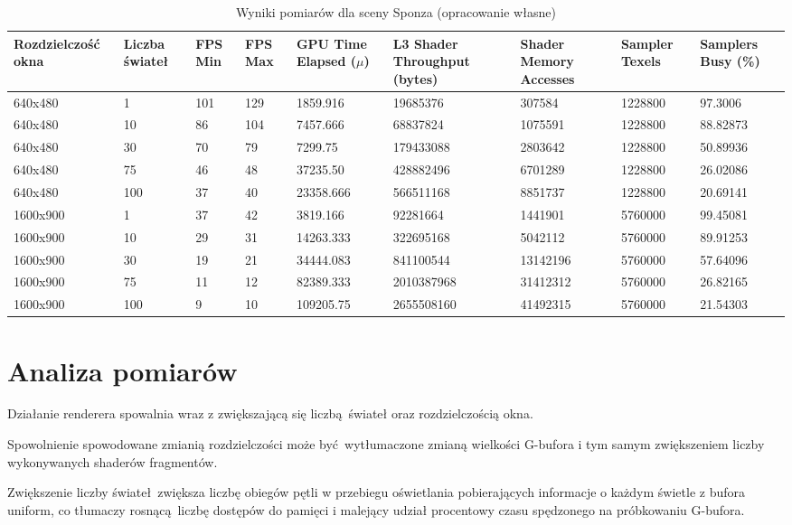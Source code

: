 \begin{table}[!ht]
	\centering
	\begin{tabular}{ |p{2cm}|p{1.1cm}||p{0.6cm}|p{0.6cm}||p{1.7cm}|p{1.8cm}|p{1.5cm}|p{1.3cm}|p{1.3cm}|}
		\hline
		Rozdzielczość okna & Liczba świateł & FPS Min & FPS Max & GPU Time Elapsed ($\mu$) & L3 Shader Throughput (bytes) & Shader Memory Accesses & Sampler Texels & Samplers Busy (\%) \\
		\hline \hline
		640x480 & 1 & 101 & 129 & 1859.916 & 19685376 & 307584 & 1228800 & 97.3006 \\
		\hline 
		640x480 & 10 & 86 & 104 & 7457.666 & 68837824 & 1075591 & 1228800 & 88.82873 \\
		\hline 
		640x480 & 30 & 70 & 79  & 7299.75 & 179433088 & 2803642 & 1228800 & 50.89936 \\
		\hline 
		640x480 & 75 & 46 & 48 & 37235.50 & 428882496 & 6701289 & 1228800 & 26.02086 \\
		\hline 
		640x480 & 100 & 37  & 40 & 23358.666 & 566511168 & 8851737 & 1228800 & 20.69141 \\
		\hline 	\hline 
		1600x900 & 1 & 37  & 42 & 3819.166 & 92281664 & 1441901 & 5760000 & 99.45081 \\
		\hline 
		1600x900 & 10 & 29  & 31 & 14263.333 & 322695168 & 5042112 & 5760000 & 89.91253 \\
		\hline 
		1600x900 & 30 & 19 & 21 & 34444.083 & 841100544 & 13142196 & 5760000 & 57.64096 \\
		\hline 
		1600x900 & 75 & 11 & 12 & 82389.333 & 2010387968 & 31412312 & 5760000 & 26.82165 \\
		\hline 
		1600x900 & 100 & 9  & 10 & 109205.75 & 2655508160 & 41492315 & 5760000 & 21.54303 \\
		\hline
	\end{tabular}
	\caption{Wyniki pomiarów dla sceny Sponza (opracowanie własne)} 
	\label{results_sponza}
\end{table}


\section{Analiza pomiarów}

Działanie renderera spowalnia wraz z zwiększającą się liczbą świateł oraz rozdzielczością okna.

Spowolnienie spowodowane zmianią rozdzielczości może być wytłumaczone zmianą wielkości G-bufora i tym samym zwiększeniem liczby wykonywanych shaderów fragmentów.

Zwiększenie liczby świateł zwiększa liczbę obiegów pętli w przebiegu oświetlania pobierających informacje o każdym świetle z bufora uniform, co tłumaczy rosnącą liczbę dostępów do pamięci i malejący udział procentowy czasu spędzonego na próbkowaniu G-bufora.
